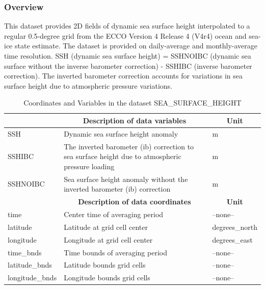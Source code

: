 \subsubsection{Overview}
This dataset provides 2D fields of dynamic sea surface height interpolated to a regular 0.5-degree grid from the ECCO Version 4 Release 4 (V4r4) ocean and sea-ice state estimate. The dataset is provided on daily-average and monthly-average time resolution. SSH (dynamic sea surface height) = SSHNOIBC (dynamic sea surface without the inverse barometer correction) - SSHIBC (inverse barometer correction). The inverted barometer correction accounts for variations in sea surface height due to atmospheric pressure variations. 
\begin{longtable}{|m{}|m{}|m{}|}
\caption{Coordinates and Variables in the dataset SEA\_SURFACE\_HEIGHT}
\label{tab:table-SEA_SURFACE_HEIGHT-fields} \\ 
\hline \endhead \hline \endfoot
\rowcolor{lightgray} \multicolumn{1}{|c|}{\textbf{Variables}} & \multicolumn{1}{|c|}{\textbf{Description of data variables}} &  \multicolumn{1}{|c|}{\textbf{Unit}}\\ \hline
SSH &Dynamic sea surface height anomaly &m  \\ \hline
SSHIBC &The inverted barometer (ib) correction to sea surface height due to atmospheric pressure loading &m  \\ \hline
SSHNOIBC &Sea surface height anomaly without the inverted barometer (ib) correction &m  \\ \hline
\rowcolor{lightgray} \multicolumn{1}{|c|}{\textbf{Coordinates}} & \multicolumn{1}{|c|}{\textbf{Description of data coordinates}} &  \multicolumn{1}{|c|}{\textbf{Unit}}\\ \hline
time &Center time of averaging period &--none--  \\ \hline
latitude &Latitude at grid cell center &degrees\_north  \\ \hline
longitude &Longitude at grid cell center &degrees\_east  \\ \hline
time\_bnds &Time bounds of averaging period &--none--  \\ \hline
latitude\_bnds &Latitude bounds grid cells &--none--  \\ \hline
longitude\_bnds &Longitude bounds grid cells &--none--  \\ \hline
\end{longtable}

\newp
\pagebreak
